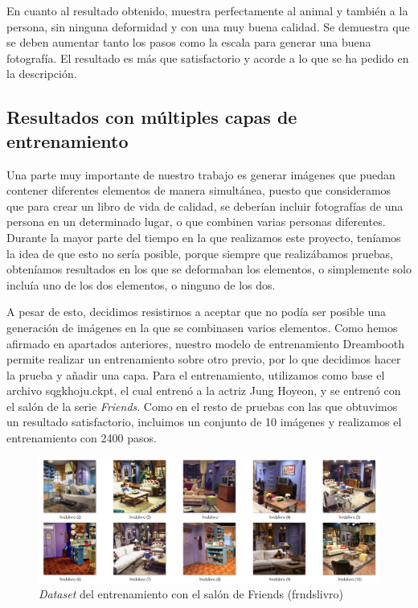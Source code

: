En cuanto al resultado obtenido, muestra perfectamente al animal y también a la persona, sin ninguna deformidad y con una muy buena calidad. Se demuestra que se deben aumentar tanto los pasos como la escala para generar una buena fotografía. El resultado es más que satisfactorio y acorde a lo que se ha pedido en la descripción.

\subsection{Resultados con múltiples capas de entrenamiento}

Una parte muy importante de nuestro trabajo es generar imágenes que puedan contener diferentes elementos de manera simultánea, puesto que consideramos que para crear un libro de vida de calidad, se deberían incluir fotografías de una persona en un determinado lugar, o que combinen varias personas diferentes. Durante la mayor parte del tiempo en la que realizamos este proyecto, teníamos la idea de que esto no sería posible, porque siempre que realizábamos pruebas, obteníamos resultados en los que se deformaban los elementos, o simplemente solo incluía uno de los dos elementos, o ninguno de los dos. 

A pesar de esto, decidimos resistirnos a aceptar que no podía ser posible una generación de imágenes en la que se combinasen varios elementos. Como hemos afirmado en apartados anteriores, nuestro modelo de entrenamiento Dreambooth permite realizar un entrenamiento sobre otro previo, por lo que decidimos hacer la prueba y añadir una capa. Para el entrenamiento, utilizamos como base el archivo sqgkhoju.ckpt, el cual entrenó a la actriz Jung Hoyeon, y se entrenó con el salón de la serie \textit{Friends}. Como en el resto de pruebas con las que obtuvimos un resultado satisfactorio, incluimos un conjunto de 10 imágenes y realizamos el entrenamiento con 2400 pasos.\\


\begin{figure}[!htb]
	\centering
	\includegraphics[width = 1
	\textwidth]{Imagenes/Vectorial/dataset_frdslivro.png}
	\caption{\textit{Dataset} del entrenamiento con el salón de Friends (frndslivro)}
	\label{fig:dataset_frdslivro}
\end{figure}


